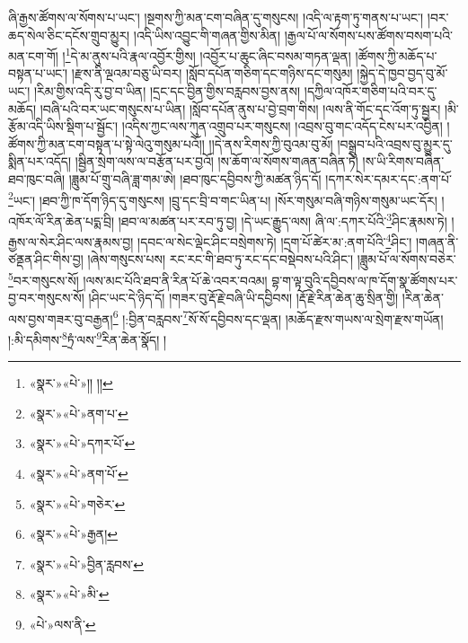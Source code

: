 ཞི་རྒྱས་ཚོགས་ལ་སོགས་པ་ཡང་། །སྔགས་ཀྱི་མན་ངག་བཞིན་དུ་གསུངས། །འདི་ལ་རྟག་ཏུ་གནས་པ་ཡང་། །བར་ཆད་སེལ་ཅིང་དངོས་གྲུབ་མྱུར། །འདི་ཡིས་འབྱུང་གི་གཞན་གྱིས་མིན། །རྒྱལ་པོ་ལ་སོགས་པས་ཚོགས་བསག་པའི་མན་ངག་གོ། །\footnote{«སྣར་»«པེ་»།། །།}དེ་མ་ནུས་པའི་རྣལ་འབྱོར་གྱིས། །འབྱོར་པ་ཆུང་ཞིང་བསམ་གཏན་ལྡན། །ཚོགས་ཀྱི་མཆོད་པ་བསྟན་པ་ཡང་། །རྫས་ནི་ལྔའམ་བཅུ་ཡི་བར། །སློབ་དཔོན་གཅིག་དང་གཉིས་དང་གསུམ། །སྐྱེད་དེ་ཁྱབ་བྱད་བུ་མོ་ཡང་། །རིམ་གྱིས་འདི་རུ་བྱ་བ་ཡིན། །དྲང་དང་བྱིན་གྱིས་བརླབས་བྱས་ནས། །དཀྱིལ་འཁོར་གཅིག་པའི་བར་དུ་མཆོད། །བཞི་པའི་བར་ཡང་གསུངས་པ་ཡིན། །སློབ་དཔོན་ནུས་པ་བྱེ་བྲག་གིས། །ལས་ནི་གོང་དང་འོག་ཏུ་སྦྱར། །མི་རྩོམ་འདི་ཡིས་སྡིག་པ་སྦྱོང་། །འདིས་ཀྱང་ལས་ཀུན་འགྲུབ་པར་གསུངས། །འབྲས་བུ་གང་འདོད་ངེས་པར་འབྱིན། །ཚོགས་ཀྱི་མན་ངག་བསྟན་པ་སྟེ་ལེའུ་གསུམ་པའོ།། །།དེ་ནས་རིགས་ཀྱི་བུའམ་བུ་མོ། །བསྒྲུབ་པའི་འབྲས་བུ་མྱུར་དུ་སྨིན་པར་འདོད། །སྦྱིན་སྲེག་ལས་ལ་བརྩོན་པར་བྱའོ། །ས་ཆོག་ལ་སོགས་གཞན་བཞིན་ཏེ། །ས་ཡི་རིགས་བཞིན་ཐབ་ཁུང་བཞི། །ཟླུམ་པོ་གྲུ་བཞི་ཟླ་གམ་ཨེ། །ཐབ་ཁུང་དབྱིབས་ཀྱི་མཚན་ཉིད་དོ། །དཀར་སེར་དམར་དང་:ནག་པོ་\footnote{«སྣར་»«པེ་»ནག་པ་}ཡང་། །ཐབ་ཀྱི་ཁ་དོག་ཉིད་དུ་གསུངས། །བྲུ་དང་བྲི་བ་གང་ཡིན་པ། །སོར་གསུམ་བཞི་གཉིས་གསུམ་ཡང་དོར། །འཁོར་ལོ་རིན་ཆེན་པདྨ་བྲི། །ཐབ་ལ་མཚན་པར་རབ་ཏུ་བྱ། །དེ་ཡང་རྒྱུད་ལས། ཞི་ལ་:དཀར་པོའི་\footnote{«སྣར་»«པེ་»དཀར་པོ་}ཤིང་རྣམས་ཏེ། །རྒྱས་ལ་སེར་ཤིང་ལས་རྣམས་བྱ། །དབང་ལ་སེང་ལྡེང་ཤིང་བསྲེགས་ཏེ། །དྲག་པོ་ཚེར་མ་:ནག་པོའི་\footnote{«སྣར་»«པེ་»ནག་པོ་}ཤིང་། །གཞན་ནི་ཙནྡན་ཤིང་གིས་བྱ། །ཞེས་གསུངས་པས། རང་རང་གི་ཐབ་ཏུ་རང་དང་བསྡེབས་པའི་ཤིང་། །ཟླུམ་པོ་ལ་སོགས་བཅེར་\footnote{«སྣར་»«པེ་»གཅེར་}བར་གསུངས་སོ། །ལས་མང་པོའི་ཐབ་ནི་རིན་པོ་ཆེ་འབར་བའམ། བྷ་ག་ལྟ་བུའི་དབྱིབས་ལ་ཁ་དོག་སྣ་ཚོགས་པར་བྱ་བར་གསུངས་སོ། །ཤིང་ཡང་དེ་ཉིད་དོ། །གཟར་བུ་རྡོ་རྗེ་བཞི་ཡི་དབྱིབས། །རྡོ་རྗེ་རིན་ཆེན་ཆུ་སྲིན་གྱི། །རིན་ཆེན་ལས་བྱས་གཟར་བུ་བརྒྱན།\footnote{«སྣར་»«པེ་»རྒྱན།} །:བྱིན་བརླབས་\footnote{«སྣར་»«པེ་»བྱིན་རླབས་}སོ་སོ་དབྱིབས་དང་ལྡན། །མཆོད་རྫས་གཡས་ལ་སྲེག་རྫས་གཡོན། །:མི་དམིགས་\footnote{«སྣར་»«པེ་»མི་}ཏྲཾ་ལས་\footnote{«པེ་»ལས་ནི་}རིན་ཆེན་སྣོད། །
